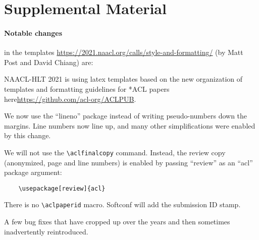 \section{Supplemental Material}
\label{sec:supplemental}



\paragraph{Notable changes} in the templates \url{https://2021.naacl.org/calls/style-and-formatting/} (by Matt Post and David Chiang) are:

NAACL-HLT 2021 is using latex templates based on the new organization of templates and formatting guidelines for *ACL papers here\url{https://github.com/acl-org/ACLPUB}.

We now use the “lineno” package instead of writing pseudo-numbers down the margins. Line numbers now line up, and many other simplifications were enabled by this change.

We will not use the \verb|\aclfinalcopy| command. Instead, the review copy (anonymized, page and line numbers) is enabled by passing “review” as an “acl” package argument:

\begin{verbatim}
    \usepackage[review]{acl}
\end{verbatim}

There is no \verb|\aclpaperid| macro. Softconf will add the submission ID stamp.

A few bug fixes that have cropped up over the years and then sometimes inadvertently reintroduced.

